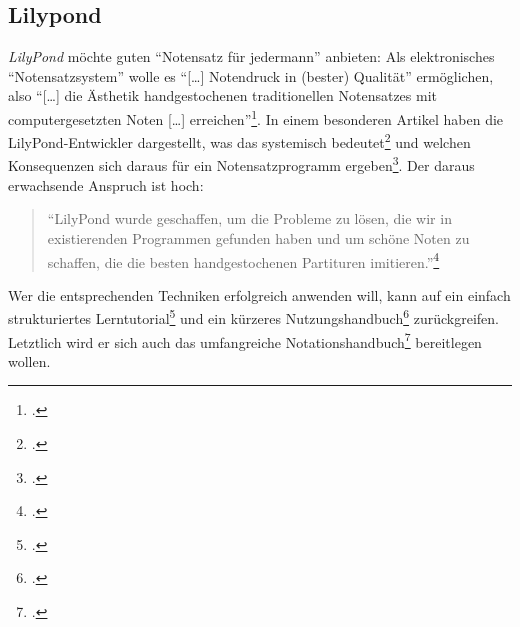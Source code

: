 %
%
%



\subsection{Lilypond}

\emph{LilyPond} möchte guten \enquote{Notensatz für jedermann} anbieten: Als
elektronisches \enquote{Notensatzsystem} wolle es \enquote{[\ldots] Notendruck
in (bester) Qualität} ermöglichen, also \enquote{[\ldots] die Ästhetik
handgestochenen traditionellen Notensatzes mit computergesetzten Noten [\ldots]
erreichen}\footcite[vgl.][\nopage wp]{LilyPond2018a}. In einem besonderen
Artikel haben die LilyPond-Entwickler dargestellt, was das systemisch
bedeutet\footcite[vgl.][5ff]{LilyPond2018d} und welchen Konsequenzen sich daraus
für ein Notensatzprogramm ergeben\footcite[vgl.][8ff]{LilyPond2018d}. Der daraus
erwachsende Anspruch ist hoch:

\begin{quote}\begin{em}
  \enquote{LilyPond wurde geschaffen, um die Probleme zu lösen, die wir in
  existierenden Programmen gefunden haben und um schöne Noten zu schaffen, die
  die besten handgestochenen Partituren imitieren.}\footcite[vgl.][2]{LilyPond2018d}
\end{em}\end{quote}

Wer die entsprechenden Techniken erfolgreich anwenden will, kann auf ein einfach
strukturiertes Lerntutorial\footcite[vgl.][20ff]{LilyPond2018b} und ein kürzeres
Nutzungshandbuch\footcite[vgl.][1ff]{LilyPond2018e} zurückgreifen. Letztlich
wird er sich auch das umfangreiche
Notationshandbuch\footcite[vgl.][1ff]{LilyPond2018c} bereitlegen wollen.

